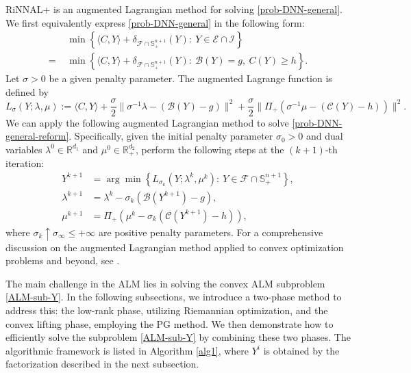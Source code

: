 \documentclass[11pt]{article}
\theoremstyle{plain}
\def\<{\big\langle}
\def\>{\big\rangle}
\def\E{\mathcal{E}}
\def\B{\mathcal{B}}
\def\C{\mathcal{C}}
\def\F{\mathcal{F}}
\def\I{\mathcal{I}}
\def\R{\mathbb{R}}
\def\S{\mathbb{S}}
\begin{document}
RiNNAL+ is an augmented Lagrangian method for solving \eqref{prob-DNN-general}. We first equivalently express \eqref{prob-DNN-general} in the following form:
\begin{align}
    &\min\left\{
\<C,Y\> +\delta_{\F\cap \mathbb{S}_{+}^{n+1}}(Y) :\  
Y\in \E\cap\I
\right\}\nonumber\\
=\,\,&\min\left\{
\<C,Y\> +\delta_{\F\cap \mathbb{S}_{+}^{n+1}}(Y) :\  
\B(Y)=g,\ C(Y)\geq h
\right\}.\label{prob-DNN-general-reform}
\end{align}
Let $\sigma>0$ be a given penalty parameter. The augmented Lagrange function is defined by
 \begin{equation*}
 L_\sigma(Y;\lambda,\mu):= \<C,Y\>+\frac{\sigma}{2}\|\sigma^{-1}\lambda-(\B(Y)-g) \|^2+\frac{\sigma}{2}\| \Pi_{+}( \sigma^{-1}\mu-(\C(Y)-h)) \|^2.
 \end{equation*}
We can apply the following augmented Lagrangian method to solve \eqref{prob-DNN-general-reform}. Specifically, given the initial penalty parameter $\sigma_0>0$ and dual variables $\lambda^0\in \R^{d_1}$ and $\mu^0\in \R^{d_2}_+$, perform the following steps at the $(k+1)$-th iteration:
\begin{align}
Y^{k+1}&=\arg\min\left\{L_{\sigma_k} (Y;\lambda^{k},\mu^{k}) :\ Y\in \F\cap \S^{n+1}_+\right\},\label{ALM-sub-Y}
\tag{CVX}\\
\lambda^{k+1}&=\lambda^{k}-\sigma_k (\B (Y^{k+1})-g),\\
\mu^{k+1}&=\Pi_+(\mu^{k}-\sigma_k (\C (Y^{k+1})-h)),\label{ALM-mu}
\end{align}
where $\sigma_k \uparrow \sigma_{\infty} \leq+\infty$ are positive penalty parameters. For a comprehensive discussion on the augmented Lagrangian method applied to convex optimization problems and beyond, see \cite{hestenes1969multiplier, powell1969method, rockafellar1976augmented}. 

The main challenge in the ALM lies in solving the convex ALM subproblem \eqref{ALM-sub-Y}. In the following subsections, we introduce 
a two-phase method to address this: the low-rank phase, utilizing Riemannian optimization, and the convex lifting phase, employing the PG method. We then demonstrate how to efficiently solve the subproblem \eqref{ALM-sub-Y} by combining these two phases. The algorithmic framework is listed in Algorithm \ref{alg1}, where $Y^{i}$ is obtained by the factorization described in the next subsection.
\end{document}
